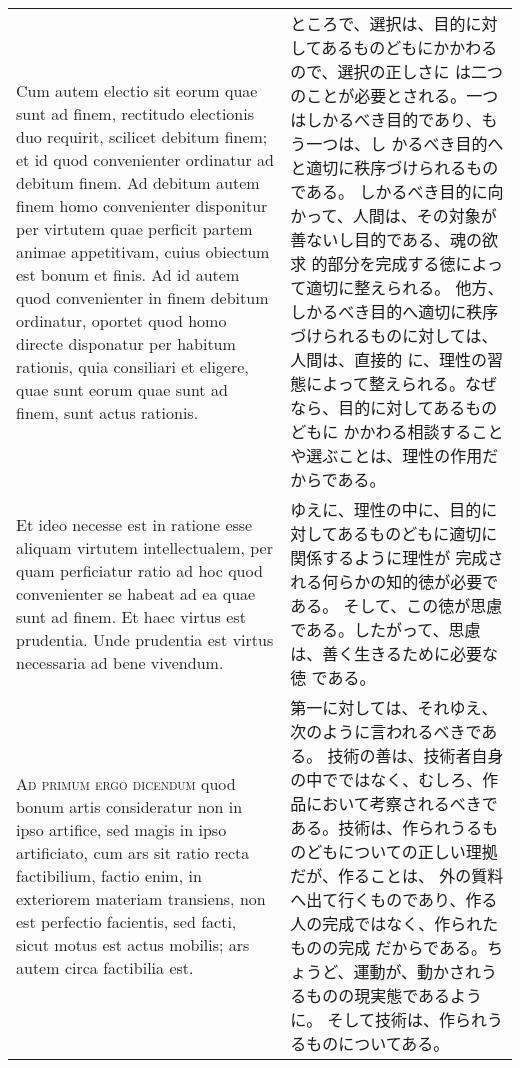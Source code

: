\documentclass[10pt]{jsarticle} %
\begin{document}
\begin{longtable}{p{21em}p{21em}}
\\


Cum autem
 electio sit eorum quae sunt ad finem, rectitudo electionis duo
 requirit, scilicet debitum finem; et id quod convenienter ordinatur ad
 debitum finem. Ad debitum autem finem homo convenienter disponitur per
 virtutem quae perficit partem animae appetitivam, cuius obiectum est
 bonum et finis. Ad id autem quod convenienter in finem debitum
 ordinatur, oportet quod homo directe disponatur per habitum rationis,
 quia consiliari et eligere, quae sunt eorum quae sunt ad finem, sunt
 actus rationis. 

&

ところで、選択は、目的に対してあるものどもにかかわるので、選択の正しさに
 は二つのことが必要とされる。一つはしかるべき目的であり、もう一つは、し
 かるべき目的へと適切に秩序づけられるものである。
しかるべき目的に向かって、人間は、その対象が善ないし目的である、魂の欲求
 的部分を完成する徳によって適切に整えられる。
他方、しかるべき目的へ適切に秩序づけられるものに対しては、人間は、直接的
 に、理性の習態によって整えられる。なぜなら、目的に対してあるものどもに
 かかわる相談することや選ぶことは、理性の作用だからである。

\\


Et ideo necesse est in ratione esse aliquam virtutem
 intellectualem, per quam perficiatur ratio ad hoc quod convenienter se
 habeat ad ea quae sunt ad finem. Et haec virtus est prudentia. Unde
 prudentia est virtus necessaria ad bene vivendum.


&

ゆえに、理性の中に、目的に対してあるものどもに適切に関係するように理性が
 完成される何らかの知的徳が必要である。
そして、この徳が思慮である。したがって、思慮は、善く生きるために必要な徳
 である。

\\



{\scshape Ad primum ergo dicendum} quod bonum artis
 consideratur non in ipso artifice, sed magis in ipso artificiato, cum
 ars sit ratio recta factibilium, factio enim, in exteriorem materiam
 transiens, non est perfectio facientis, sed facti, sicut motus est
 actus mobilis; ars autem circa factibilia est. 


&

第一に対しては、それゆえ、次のように言われるべきである。
技術の善は、技術者自身の中でではなく、むしろ、作品において考察されるべきで
 ある。技術は、作られうるものどもについての正しい理拠だが、作ることは、
 外の質料へ出て行くものであり、作る人の完成ではなく、作られたものの完成
 だからである。ちょうど、運動が、動かされうるものの現実態であるように。
そして技術は、作られうるものについてある。


\end{longtable}
\end{document}
